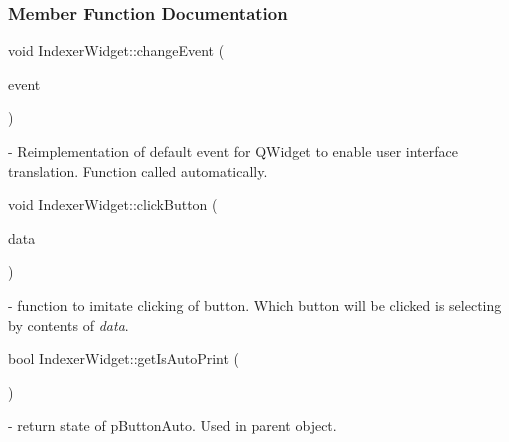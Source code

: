 \subsubsection{Member Function Documentation}
\mbox{\label{classIndexerWidget_a6c63cfdeb49de1b9a64a6b3fc8b4d997}} 
{\footnotesize\ttfamily void Indexer\+Widget\+::\texorpdfstring{change\+Event}{changeEvent} (\begin{DoxyParamCaption}\item[{Q\+Event $\ast$}]{event }\end{DoxyParamCaption}){\ttfamily [protected]}} - Reimplementation of default event for Q\+Widget to enable user interface translation. Function called automatically.

\mbox{\label{classIndexerWidget_abe1eb2eae0c93dff7d5f0d9cbf9cd371}} 
{\footnotesize\ttfamily void Indexer\+Widget\+::\texorpdfstring{click\+Button}{clickButton} (\begin{DoxyParamCaption}\item[{Q\+Byte\+Array}]{data }\end{DoxyParamCaption})} - function to imitate clicking of button. Which button will be clicked is selecting by contents of \textit{data}.

\mbox{\label{classIndexerWidget_a7e4a847aba65f7a17c5b6ceaf8a59636}} 
{\footnotesize\ttfamily bool Indexer\+Widget\+::\texorpdfstring{get\+Is\+Auto\+Print}{getIsAutoPrint} (\begin{DoxyParamCaption}{ }\end{DoxyParamCaption})} - return state of p\+Button\+Auto. Used in parent object.

